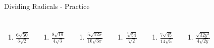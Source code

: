 \documentclass[aspectratio=169]{beamer}
\begin{document}
\begin{frame}{Dividing Radicals - Practice}
\begin{tcolorbox}[colback=lightgray,colframe=accent,title=Practice Problems]
\footnotesize
\begin{columns}[T]
\begin{enumerate}[label=2\textbf{a})]
  \item $\frac{6\sqrt{50}}{3\sqrt{2}}$
\end{enumerate}
\begin{enumerate}[label=2\textbf{b})]
  \item $\frac{8\sqrt{18}}{4\sqrt{3}}$
\end{enumerate}
\begin{enumerate}[label=2\textbf{c})]
  \item $\frac{5\sqrt{12x}}{10\sqrt{3x}}$
\end{enumerate}
\begin{enumerate}[label=2\textbf{d})]
  \item $\frac{\sqrt[3]{54}}{\sqrt[3]{2}}$
\end{enumerate}
\begin{enumerate}[label=2\textbf{e})]
  \item $\frac{7\sqrt{45}}{14\sqrt{5}}$
\end{enumerate}
\begin{enumerate}[label=2\textbf{f})]
  \item $\frac{\sqrt{32y^3}}{4\sqrt{2y}}$
\end{enumerate}
\end{columns}
\end{tcolorbox}
\end{frame}
\end{document}
